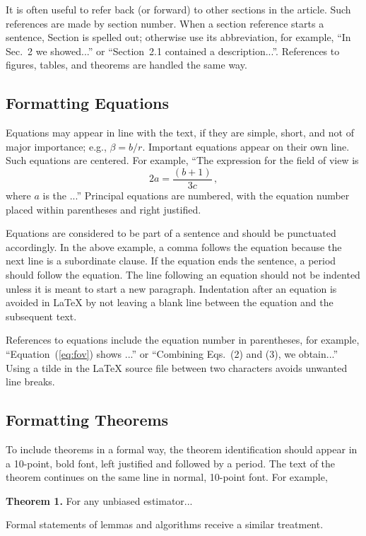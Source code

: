 \documentclass[../main.tex]{subfiles}
\begin{document}
It is often useful to refer back (or forward) to other sections in the article.  Such references are made by section number.  When a section reference starts a sentence, Section is spelled out; otherwise use its abbreviation, for example, ``In Sec.~2 we showed...'' or ``Section~2.1 contained a description...''.  References to figures, tables, and theorems are handled the same way.

\subsection{Formatting Equations}
Equations may appear in line with the text, if they are simple, short, and not of major importance; e.g., $\beta = b/r$.  Important equations appear on their own line.  Such equations are centered.  For example, ``The expression for the field of view is
\begin{equation}
\label{eq:fov}
2 a = \frac{(b + 1)}{3c} \, ,
\end{equation}
where $a$ is the ...'' Principal equations are numbered, with the equation number placed within parentheses and right justified.  

Equations are considered to be part of a sentence and should be punctuated accordingly. In the above example, a comma follows the equation because the next line is a subordinate clause.  If the equation ends the sentence, a period should follow the equation.  The line following an equation should not be indented unless it is meant to start a new paragraph.  Indentation after an equation is avoided in LaTeX by not leaving a blank line between the equation and the subsequent text.

References to equations include the equation number in parentheses, for example, ``Equation~(\ref{eq:fov}) shows ...'' or ``Combining Eqs.~(2) and (3), we obtain...''  Using a tilde in the LaTeX source file between two characters avoids unwanted line breaks.

\subsection{Formatting Theorems}

To include theorems in a formal way, the theorem identification should appear in a 10-point, bold font, left justified and followed by a period.  The text of the theorem continues on the same line in normal, 10-point font.  For example, 

\noindent\textbf{Theorem 1.} For any unbiased estimator...

Formal statements of lemmas and algorithms receive a similar treatment.
\end{document}
